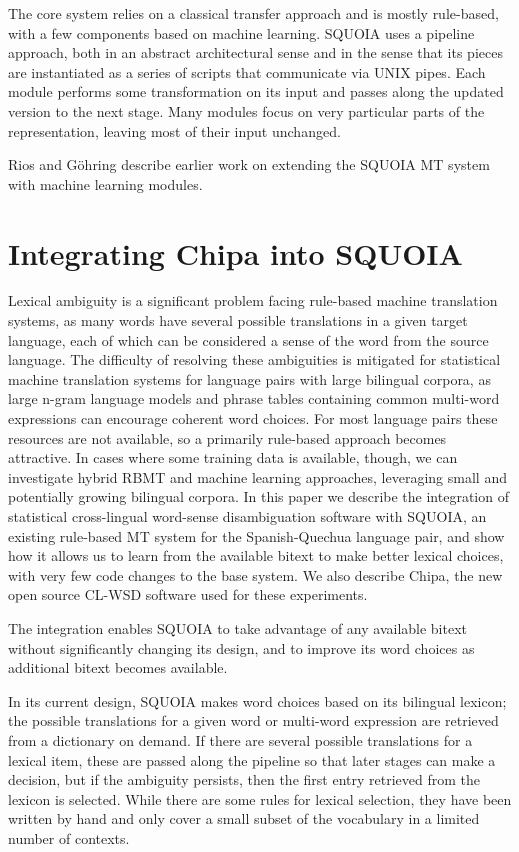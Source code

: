 The core system relies on a classical transfer approach and is mostly
rule-based, with a few components based on machine learning.
SQUOIA uses a pipeline approach, both in an abstract architectural sense and in
the sense that its pieces are instantiated as a series of scripts that communicate
via UNIX pipes. Each module performs some transformation on its input and
passes along the updated version to the next stage. Many modules focus on very
particular parts of the representation, leaving most of their input unchanged.

Rios and G\"{o}hring \cite{riosgonzales-gohring:2013:HyTra} describe
earlier work on extending the SQUOIA MT system with machine learning modules.

\section{Integrating Chipa into SQUOIA}

Lexical ambiguity is a significant problem facing rule-based machine
translation systems, as many words have several possible translations in a
given target language, each of which can be considered a sense of the word from
the source language.
The difficulty of resolving these ambiguities is mitigated for 
statistical machine translation systems for language pairs with large bilingual
corpora, as large n-gram language models and phrase tables containing common
multi-word expressions can encourage coherent word choices.
For most language pairs these resources are not available, so a primarily
rule-based approach becomes attractive.
In cases where some training data is available, though, we can
investigate hybrid RBMT and machine learning approaches, leveraging small and
potentially growing bilingual corpora. In this paper we
describe the integration of statistical cross-lingual word-sense disambiguation
software with SQUOIA, an existing rule-based MT system for the Spanish-Quechua
language pair, and show how it allows us to learn from the available bitext to
make better lexical choices, with very few code changes to the base system. We
also describe Chipa, the new open source CL-WSD software used for these
experiments.

The integration enables SQUOIA to take advantage of any available bitext
without significantly changing its design, and to improve its word choices as
additional bitext becomes available.

In its current design, SQUOIA makes word choices based on its bilingual
lexicon; the possible translations for a given word or multi-word expression
are retrieved from a dictionary on demand. If there are several possible
translations for a lexical item, these are passed along the pipeline so
that later stages can make a decision, but if the ambiguity persists,
then the first entry retrieved from the lexicon is selected. While there are
some rules for lexical selection, they have been written by hand and only cover
a small subset of the vocabulary in a limited number of contexts.

